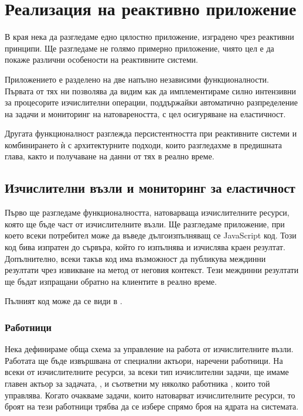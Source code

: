 \chapter{Реализация на реактивно приложение}

В края нека да разгледаме едно цялостно приложение, изградено чрез реактивни принципи. Ще разгледаме не голямо примерно приложение, чиято цел е да покаже различни особености на реактивните системи.

Приложението е разделено на две напълно независими функционалности. Първата от тях ни позволява да видим как да имплементираме силно интензивни за процесорите изчислителни операции, поддържайки автоматично разпределение на задачи и мониторинг на натовареността, с цел осигуряване на еластичност.

Другата функционалност разглежда персистентността при реактивните системи и комбинирането ѝ с архитектурните подходи, които разгледахме в предишната глава, както и получаване на данни от тях в реално време.

\section{Изчислителни възли и мониторинг за еластичност}

Първо ще разгледаме функционалността, натоварваща изчислителните ресурси, която ще бъде част от изчислителните възли. Ще разгледаме приложение, при което всеки потребител може да въведе дългоизпълняващ се JavaScript код. Този код бива изпратен до сървъра, който го изпълнява и изчислява краен резултат. Допълнително, всеки такъв код има възможност да публикува междинни резултати чрез извикване на  метод от неговия контекст. Тези междинни резултати ще бъдат изпращани обратно на клиентите в реално време.

Пълният код може да се види в .

\subsection{Работници}

Нека дефинираме обща схема за управление на работа от изчислителните възли. Работата ще бъде извършвана от специални актьори, наречени работници. На всеки от изчислителните ресурси, за всеки тип изчислителни задачи, ще имаме главен актьор за задачата, , и съответни му няколко работника , които той управлява. Когато очакваме задачи, които натоварват изчислителните ресурси, то броят на тези работници трябва да се избере спрямо броя на ядрата на системата.
 

